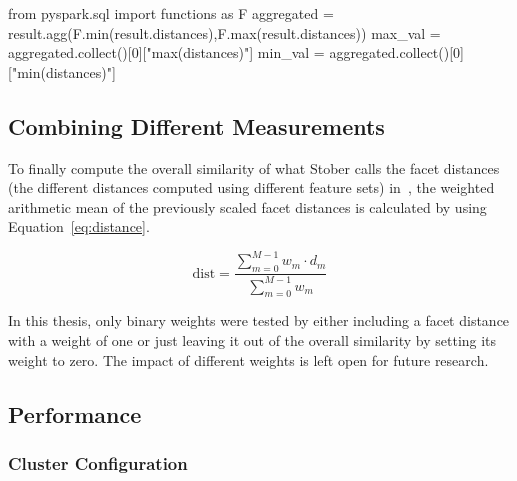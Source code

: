 \begin{pythonCode}[frame=single,label={lst:mindf2},caption={Minimum and maximum aggregation optimized},captionpos=b]
from pyspark.sql import functions as F
aggregated = result.agg(F.min(result.distances),F.max(result.distances))
max_val = aggregated.collect()[0]["max(distances)"]
min_val = aggregated.collect()[0]["min(distances)"]
\end{pythonCode}


\subsection{Combining Different Measurements}\label{weighedsum}

To finally compute the overall similarity of what Stober calls the facet distances (the different distances computed using different feature sets) in~\cite[pp. 543ff]{musicdata}, the weighted arithmetic mean of the previously scaled facet distances is calculated by using Equation~\eqref{eq:distance}.

\begin{equation} \label{eq:distance}
\text{dist} = \frac{\sum_{m = 0}^{M - 1}{w_m \cdot d_m}}{\sum_{m = 0}^{M - 1}{w_m}}
\end{equation}

\noindent In this thesis, only binary weights were tested by either including a facet distance with a weight of one or just leaving it out of the overall similarity by setting its weight to zero. The impact of different weights is left open for future research. 

\subsection{Performance}\label{sparkperf}

\subsubsection{Cluster Configuration} %


